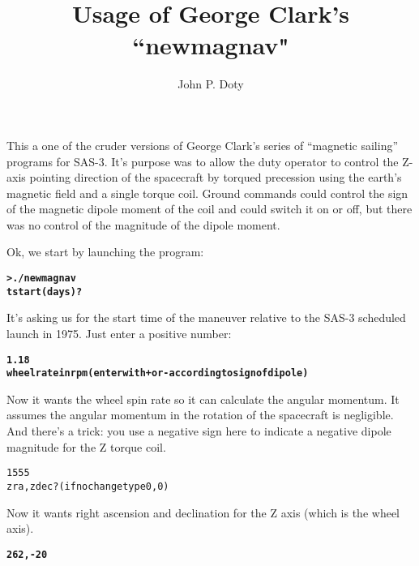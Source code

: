 \documentclass[11pt]{article}
\title{Usage of George Clark's ``newmagnav"}
\author{John P. Doty}
\date{}
\begin{document}
\maketitle

This a one of the cruder versions of George Clark's series of ``magnetic sailing'' programs for SAS-3. It's purpose was to allow the duty operator to control the Z-axis pointing direction of the spacecraft by torqued precession using the earth's magnetic field and a single torque coil. Ground commands could control the sign of the magnetic dipole moment of the coil and could switch it on or off, but there was no control of the magnitude of the dipole moment.

Ok, we start by launching the program:
\begin{alltt}
\bfseries
> ./newmagnav
      tstart (days)?
\end{alltt}   
It's asking us for the start time of the maneuver relative to the SAS-3 scheduled launch in 1975. Just enter a positive number:
\begin{alltt}
\bfseries
1.18
      wheel rate in rpm (enter with + or - according to sign of dipole)
\end{alltt}

Now it wants the wheel spin rate so it can calculate the angular momentum. It assumes the angular momentum in the rotation of the spacecraft is negligible. And there's a trick: you use a negative sign here to indicate a negative dipole magnitude for the Z torque coil.
\begin{alltt}
\bfseries

1555
      zra,zdec? (if no change type 0,0)
\end{alltt}
Now it wants right ascension and declination for the Z axis (which is the wheel axis).
\begin{alltt}
\bfseries
262,-20
\end{alltt}
\end{document}
